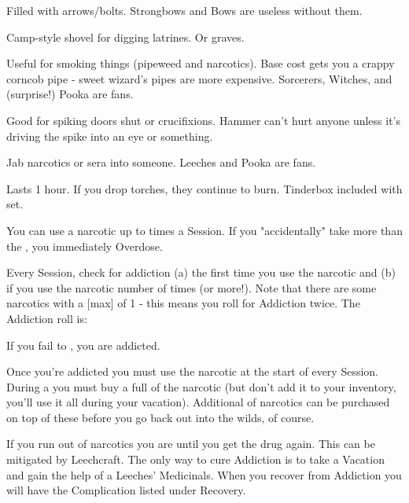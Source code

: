{\begin{multicols}{2}
   Filled with arrows/bolts.  Strongbows and Bows are useless without them.
  
   Camp-style shovel for digging latrines.  Or graves.
  
   Useful for smoking things (pipeweed and narcotics). Base cost gets you a crappy corncob pipe - sweet wizard's pipes are more expensive.  Sorcerers, Witches, and (surprise!) Pooka are fans.
  
   Good for spiking doors shut or crucifixions.  Hammer can't hurt anyone unless it's driving the spike into an eye or something.
  
   Jab narcotics or sera into someone.  Leeches and Pooka are fans.
  
   Lasts 1 hour. If you drop torches, they continue to burn.  Tinderbox included with set.

  \newpage


You can use a narcotic up to \MAX times a Session. If you "accidentally" take more than the \MAX, you immediately Overdose.



   Every Session, check for addiction (a) the first time you use the narcotic and (b) if you use the narcotic \MAX number of times (or more!). Note that there are some narcotics with a [max] of 1 - this means you roll for Addiction twice. The Addiction roll is:


  If you fail to \RO, you are addicted.  

  Once you're addicted you must use the narcotic at the start of every Session.  During a  you must buy a full \UD of the narcotic (but don't add it to your inventory, you'll use it all during your vacation).  Additional \UD of narcotics can be purchased on top of these before you go back out into the wilds, of course.

  If you run out of narcotics you are  until you get the drug again.  This can be mitigated by Leechcraft. The only way to cure Addiction is to take a Vacation and gain the help of a Leeches' Medicinals\footnotemark.  When you recover from Addiction you will have the Complication listed under Recovery.


\end{multicols}}
